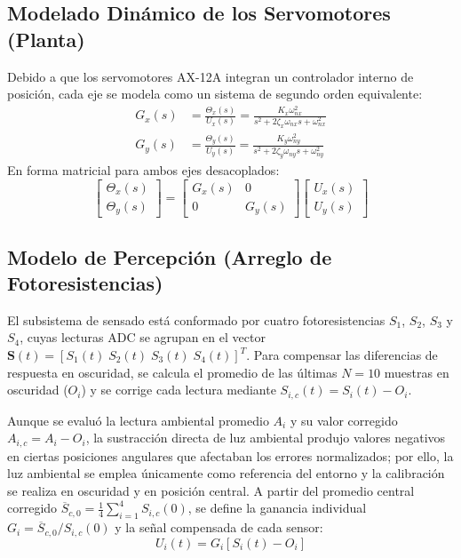 \documentclass[12pt,a4paper]{article}
\begin{document}
\subsection{Modelado Dinámico de los Servomotores (Planta)}
Debido a que los servomotores AX-12A integran un controlador interno de posición, cada eje se modela como un sistema de segundo orden equivalente:
\begin{align}
G_x(s) &= \frac{\Theta_x(s)}{U_x(s)} = \frac{K_x\omega_{nx}^2}{s^2 + 2\zeta_x\omega_{nx}s + \omega_{nx}^2} \\
G_y(s) &= \frac{\Theta_y(s)}{U_y(s)} = \frac{K_y\omega_{ny}^2}{s^2 + 2\zeta_y\omega_{ny}s + \omega_{ny}^2}
\end{align}
En forma matricial para ambos ejes desacoplados:
\begin{equation}
\begin{bmatrix} \Theta_x(s)\\ \Theta_y(s) \end{bmatrix} = \begin{bmatrix} G_x(s)&0\\ 0&G_y(s) \end{bmatrix} \begin{bmatrix} U_x(s)\\ U_y(s) \end{bmatrix}
\end{equation}

\subsection{Modelo de Percepción (Arreglo de Fotoresistencias)}
El subsistema de sensado está conformado por cuatro fotoresistencias $S_1$, $S_2$, $S_3$ y $S_4$, cuyas lecturas ADC se agrupan en el vector $\mathbf{S}(t) = [S_1(t)\; S_2(t)\; S_3(t)\; S_4(t)]^T$. Para compensar las diferencias de respuesta en oscuridad, se calcula el promedio de las últimas $N=10$ muestras en oscuridad ($O_i$) y se corrige cada lectura mediante $S_{i,c}(t) = S_i(t) - O_i$.

Aunque se evaluó la lectura ambiental promedio $A_i$ y su valor corregido $A_{i,c} = A_i - O_i$, la sustracción directa de luz ambiental produjo valores negativos en ciertas posiciones angulares que afectaban los errores normalizados; por ello, la luz ambiental se emplea únicamente como referencia del entorno y la calibración se realiza en oscuridad y en posición central. A partir del promedio central corregido $\overline{S}_{c,0} = \frac{1}{4}\sum_{i=1}^{4} S_{i,c}(0)$, se define la ganancia individual $G_i = \overline{S}_{c,0}/S_{i,c}(0)$ y la señal compensada de cada sensor:
\begin{equation}
U_i(t) = G_i\left[S_i(t) - O_i\right]
\end{equation}
\end{document}
